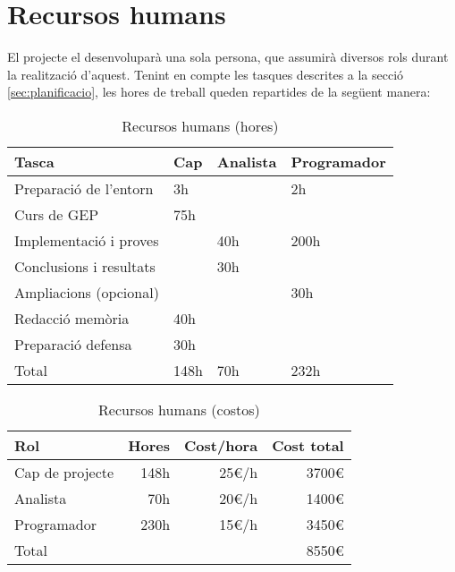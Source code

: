 \section{Recursos humans}
	El projecte el desenvoluparà una sola persona, que assumirà diversos rols durant la realització d'aquest. Tenint en compte les tasques descrites a la secció \ref{sec:planificacio},
	les hores de treball queden repartides de la següent manera:
	\begin{table}[H]
		\begin{center}
			\begin{tabular}{m{4.2cm} !{\vrule width -1pt}x{2.4cm} !{\vrule width -1pt}x{2.4cm} !{\vrule width -1pt}x{3cm}}
				\textbf{Tasca} & \textbf{Cap} & \textbf{Analista} & \textbf{Programador} \\ \hline
				Preparació de l'entorn & 3h & & 2h \\
				Curs de GEP & 75h & & \\
				Implementació i proves & & 40h & 200h \\
				Conclusions i resultats & & 30h & \\
				Ampliacions (opcional) & & & 30h\\
				Redacció memòria & 40h & & \\
				Preparació defensa & 30h & & \\
				\noalign{\vskip 4mm}
				Total & 148h & 70h & 232h
			\end{tabular}
		\end{center}
		\caption{Recursos humans (hores)}
	\end{table}
	\begin{table}[H]
		\begin{center}
			\begin{tabular}{l !{\vrule width -1pt}r !{\vrule width -1pt}r !{\vrule width -1pt}r}
				\textbf{Rol} & \textbf{Hores} & \textbf{Cost/hora} & \textbf{Cost total} \\ \hline
				Cap de projecte & 148h & 25€/h & 3700€ \\
				Analista & 70h & 20€/h & 1400€ \\
				Programador & 230h & 15€/h & 3450€ \\
				\noalign{\vskip 4mm}
				Total & & & 8550€
			\end{tabular}
		\end{center}
		\caption{Recursos humans (costos)}
	\end{table}


